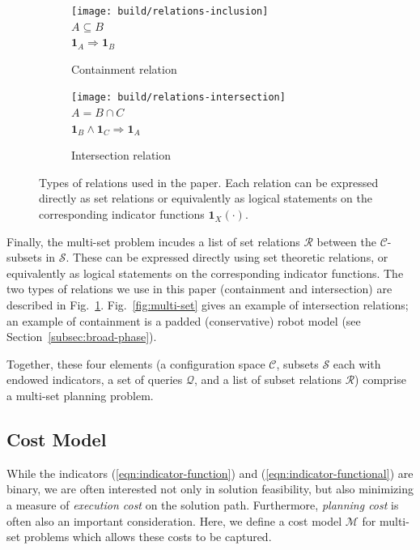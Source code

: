 \begin{figure}
\centering
\begin{subfigure}[t]{0.45\linewidth}
\centering
\texttt{[image: build/relations-inclusion]} \\
$A \subseteq B$ \\
$\mathbf{1}_A \Rightarrow \mathbf{1}_B$
\caption{Containment relation}
\end{subfigure}%
\quad\quad%
\begin{subfigure}[t]{0.45\linewidth}
\centering
\texttt{[image: build/relations-intersection]} \\
$A = B \cap C$ \\
$\mathbf{1}_B \wedge \mathbf{1}_C \Rightarrow \mathbf{1}_A$
\caption{Intersection relation}
\end{subfigure}
\caption{Types of relations used in the paper.
  Each relation can be expressed directly as set relations
  or equivalently as logical statements
  on the corresponding indicator functions
  $\mathbf{1}_X(\cdot)$.}
\label{fig:relations}
\end{figure}

Finally, the multi-set problem incudes a list of set relations
$\mathcal{R}$
between the $\mathcal{C}$-subsets in $\mathcal{S}$.
These can be expressed directly using set theoretic relations,
or equivalently as logical statements
on the corresponding indicator functions.
The two types of relations we use in this paper
(containment and intersection)
are described in Fig.~\ref{fig:relations}.
Fig.~\ref{fig:multi-set} gives an example of intersection relations;
an example of containment is a padded (conservative)
robot model (see Section~\ref{subsec:broad-phase}).

Together, these four elements
(a configuration space $\mathcal{C}$,
subsets $\mathcal{S}$ each with endowed indicators,
a set of queries $\mathcal{Q}$,
and a list of subset relations $\mathcal{R}$)
comprise a multi-set planning problem.

\subsection{Cost Model}
\label{subsec:cost-model}

While the indicators
(\ref{eqn:indicator-function}) and (\ref{eqn:indicator-functional})
are binary,
we are often interested not only in solution feasibility,
but also minimizing a measure of \emph{execution cost}
on the solution path.
Furthermore,
\emph{planning cost} is often also an important consideration.
Here,
we define a cost model $\mathcal{M}$
for multi-set problems
which allows these costs to be captured.

